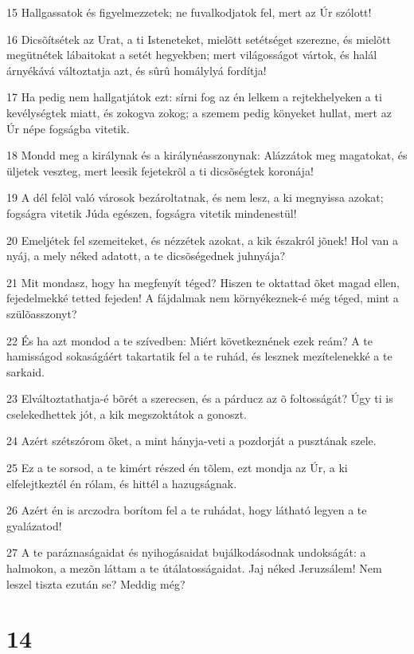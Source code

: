 \par 15 Hallgassatok és figyelmezzetek; ne fuvalkodjatok fel, mert az Úr szólott!
\par 16 Dicsõítsétek az Urat, a ti Isteneteket, mielõtt setétséget szerezne, és mielõtt megütnétek lábaitokat a setét hegyekben; mert  világosságot vártok, és halál árnyékává változtatja azt, és sûrû homálylyá fordítja!
\par 17 Ha pedig nem hallgatjátok ezt: sírni fog az én lelkem a rejtekhelyeken a ti kevélységtek miatt, és zokogva zokog; a szemem pedig könyeket hullat, mert az Úr népe fogságba  vitetik.
\par 18 Mondd meg a királynak és a királynéasszonynak: Alázzátok meg magatokat, és üljetek veszteg, mert leesik fejetekrõl a ti dicsõségtek koronája!
\par 19 A dél felõl való városok bezároltatnak, és nem lesz, a ki megnyissa azokat; fogságra vitetik Júda egészen, fogságra vitetik mindenestül!
\par 20 Emeljétek fel szemeiteket, és nézzétek azokat, a kik északról jõnek! Hol van a nyáj, a mely néked adatott, a te dicsõségednek juhnyája?
\par 21 Mit mondasz, hogy ha megfenyít téged? Hiszen te oktattad õket magad ellen, fejedelmekké tetted fejeden! A fájdalmak nem környékeznek-é még téged, mint a szülõasszonyt?
\par 22 És ha azt mondod a te szívedben: Miért következnének ezek reám? A te hamisságod sokaságáért takartatik fel a te ruhád, és lesznek mezítelenekké a te sarkaid.
\par 23 Elváltoztathatja-é bõrét a szerecsen, és a párducz az õ foltosságát? Úgy ti is cselekedhettek jót, a kik megszoktátok a gonoszt.
\par 24 Azért szétszórom õket, a mint hányja-veti a pozdorját a pusztának szele.
\par 25 Ez a te sorsod, a te kimért részed én tõlem, ezt mondja az Úr, a ki elfelejtkeztél én rólam, és hittél a hazugságnak.
\par 26 Azért én is arczodra borítom fel a te ruhádat, hogy látható legyen a te gyalázatod!
\par 27 A te paráznaságaidat és nyihogásaidat bujálkodásodnak undokságát: a  halmokon, a mezõn láttam a te útálatosságaidat. Jaj néked Jeruzsálem! Nem  leszel tiszta ezután se? Meddig még?

\chapter{14}

